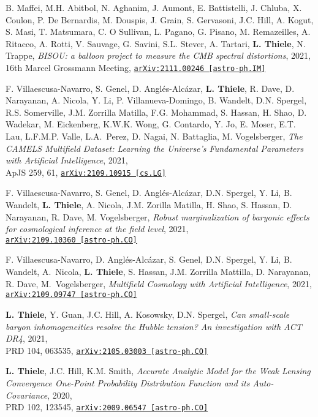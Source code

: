 B. Maffei, M.H. Abitbol, N. Aghanim, J. Aumont, E. Battistelli, J. Chluba,
X. Coulon, P. De Bernardis, M. Douspis, J. Grain, S. Gervasoni, J.C. Hill,
A. Kogut, S. Masi, T. Matsumara, C. O Sullivan, L. Pagano, G. Pisano,
M. Remazeilles, A. Ritacco, A. Rotti, V. Sauvage, G. Savini, S.L. Stever,
A. Tartari, {\bf L. Thiele}, N. Trappe,
\emph{BISOU: a balloon project to measure the CMB spectral distortions}, 2021,\\
16th Marcel Grossmann Meeting,
\href{https://arxiv.org/abs/2111.00246}{\mbox{\texttt{arXiv:2111.00246 [astro-ph.IM]}}}

F. Villaescusa-Navarro, S. Genel, D. Angl\'es-Alc\'azar, {\bf L. Thiele},
R. Dave, D. Narayanan, A. Nicola, Y. Li, P. Villanueva-Domingo, B. Wandelt,
D.N. Spergel, R.S. Somerville, J.M. Zorrilla Matilla, F.G. Mohammad, S. Hassan,
H. Shao, D. Wadekar, M. Eickenberg, K.W.K. Wong, G. Contardo, Y. Jo, E. Moser,
E.T. Lau, L.F.M.P. Valle, L.A.~Perez, D. Nagai, N. Battaglia, M. Vogelsberger,
\emph{The CAMELS Multifield Dataset: Learning the Universe's Fundamental
      Parameters with Artificial Intelligence}, 2021,\\
ApJS 259, 61,
\href{https://arxiv.org/abs/2109.10915}{\mbox{\texttt{arXiv:2109.10915 [cs.LG]}}}

F. Villaescusa-Navarro, S. Genel, D. Angl\'es-Alc\'azar, D.N. Spergel, Y. Li,
B. Wandelt, {\bf L. Thiele}, A. Nicola, J.M. Zorilla Matilla, H. Shao,
S. Hassan, D. Narayanan, R. Dave, M. Vogelsberger,
\emph{Robust marginalization of baryonic effects for cosmological inference
      at the field level}, 2021,\\
\href{https://arxiv.org/abs/2109.10360}{\mbox{\texttt{arXiv:2109.10360 [astro-ph.CO]}}}

F. Villaescusa-Navarro, D. Angl\'es-Alc\'azar, S. Genel, D.N. Spergel, Y. Li,
B. Wandelt, A.~Nicola, {\bf L. Thiele}, S. Hassan, J.M. Zorrilla Mattilla,
D. Narayanan, R. Dave, M.~Vogelsberger,
\emph{Multifield Cosmology with Artificial Intelligence}, 2021,\\
\href{https://arxiv.org/abs/2109.09747}{\mbox{\texttt{arXiv:2109.09747 [astro-ph.CO]}}}

{\bf L. Thiele}, Y. Guan, J.C. Hill, A. Kosowsky, D.N. Spergel,
\emph{Can small-scale baryon inhomogeneities resolve the Hubble tension?
      An investigation with ACT DR4}, 2021,\\
PRD 104, 063535,
\href{https://arxiv.org/abs/2105.03003}{\mbox{\texttt{arXiv:2105.03003 [astro-ph.CO]}}}

{\bf L. Thiele}, J.C. Hill, K.M. Smith,
\emph{Accurate Analytic Model for the Weak Lensing Convergence One-Point Probability
      Distribution Function and its Auto-Covariance}, 2020,\\
PRD 102, 123545,
\href{https://arxiv.org/abs/2009.06547}{\mbox{\texttt{arXiv:2009.06547 [astro-ph.CO]}}}

